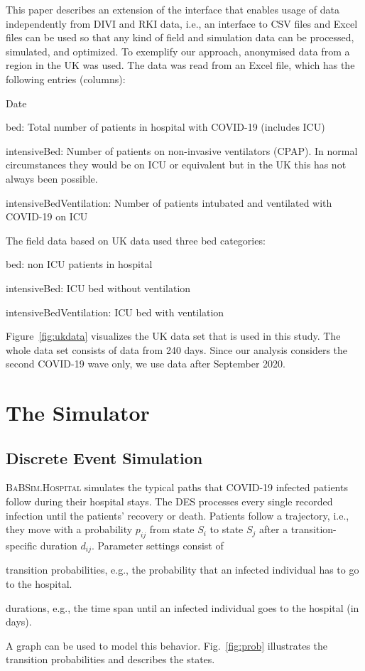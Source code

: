 \documentclass[conference]{IEEEtran}
\def\figref#1{Fig.~\ref{#1}}
\newcommand{\babsimhospital}{\textsc{BaBSim.Hospital}\xspace}
\begin{document}
This paper describes an extension of the interface that enables usage of data independently from \gls{DIVI} and \gls{RKI} data, i.e., an interface to \gls{CSV} files and Excel files can be used so that any kind of field and simulation data can be processed, simulated, and optimized.
To exemplify our approach, anonymised data from a region in the UK was used. 
The data was read from an Excel file, which has the following entries (columns):
\begin{compactitem}
\item Date
\item bed: Total number of patients in hospital with \gls{COVID-19} (includes ICU)
\item intensiveBed: Number of patients on non-invasive ventilators (CPAP). In normal circumstances they would be on ICU or equivalent but in the UK this has not always been possible.
\item intensiveBedVentilation: Number of patients intubated and ventilated with \gls{COVID-19} on ICU
\end{compactitem}
The field data based on UK data used three bed categories: 
\begin{compactenum}
\item bed: non ICU patients in hospital
\item intensiveBed: ICU bed without ventilation
\item intensiveBedVentilation: \gls{ICU} bed with ventilation
\end{compactenum}
Figure~\ref{fig:ukdata} visualizes the UK data set that is used in this study. The whole data set consists of data from 240 days. Since our analysis considers the second \gls{COVID-19} wave only, we use data after September 2020.



\section{The Simulator}\label{sec:sim}
\subsection{Discrete Event Simulation}
\babsimhospital simulates the typical paths that COVID-19 infected patients follow during their hospital stays. 
The \gls{DES} processes every single recorded infection until the patients' recovery or death. 
Patients follow a trajectory, i.e., they move with a probability $p_{ij}$ from state $S_i$ to state $S_j$  after a transition-specific duration $d_{ij}$.
Parameter settings consist of
\begin{compactitem}
\item transition probabilities, e.g., the probability that an infected
   individual has to go to the hospital. 
\item  durations, e.g., the time span until an infected individual goes to the
   hospital (in days). 
\end{compactitem}
A graph can be used to model this behavior.
\figref{fig:prob} illustrates the transition probabilities and describes the states.
\end{document}

